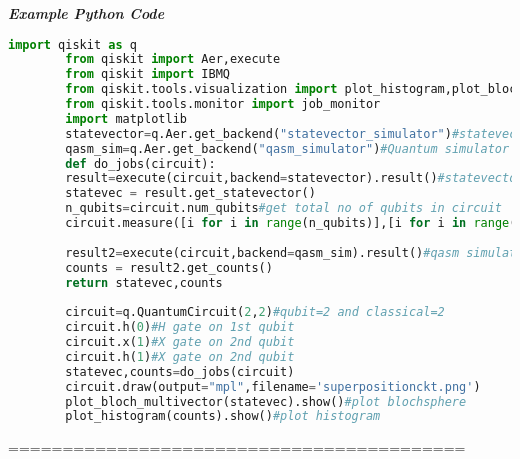 \documentclass{article}
\begin{document}
	\textbf{\textit{Example Python Code}}
	\begin{lstlisting}[language=python]
		import qiskit as q
		from qiskit import Aer,execute
		from qiskit import IBMQ
		from qiskit.tools.visualization import plot_histogram,plot_bloch_multivector
		from qiskit.tools.monitor import job_monitor
		import matplotlib
		statevector=q.Aer.get_backend("statevector_simulator")#statevector simulator
		qasm_sim=q.Aer.get_backend("qasm_simulator")#Quantum simulator
		def do_jobs(circuit):
		result=execute(circuit,backend=statevector).result()#statevectors of statevec 
		statevec = result.get_statevector()
		n_qubits=circuit.num_qubits#get total no of qubits in circuit
		circuit.measure([i for i in range(n_qubits)],[i for i in range(n_qubits)])# measure qubits and store in classical bits
		
		result2=execute(circuit,backend=qasm_sim).result()#qasm simulator
		counts = result2.get_counts()
		return statevec,counts
		
		circuit=q.QuantumCircuit(2,2)#qubit=2 and classical=2
		circuit.h(0)#H gate on 1st qubit 
		circuit.x(1)#X gate on 2nd qubit
		circuit.h(1)#X gate on 2nd qubit
		statevec,counts=do_jobs(circuit)
		circuit.draw(output="mpl",filename='superpositionckt.png')
		plot_bloch_multivector(statevec).show()#plot blochsphere
		plot_histogram(counts).show()#plot histogram
	\end{lstlisting}
	==========================================
	
\end{document}
